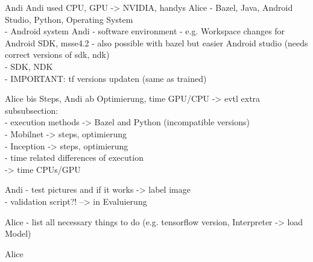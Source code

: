 	 Andi
	 Andi
		used CPU, GPU -> NVIDIA, handys
	 Alice
	- Bazel, Java, Android Studio, Python, Operating System \\
 	- Android system
	 Andi
 		- software environment
				- e.g. Workspace changes for Android SDK, msse4.2
				- also possible with bazel but easier Android studio (needs correct versions of sdk, ndk) \\
				- SDK, NDK \\
				- IMPORTANT: tf versions updaten (same as trained)

	 Alice bis Steps, Andi ab Optimierung, time GPU/CPU
	-> evtl extra subsubsection: \\
		- execution methods -> Bazel and Python (incompatible versions) \\
		- Mobilnet -> steps, optimierung \\
		- Inception -> steps, optimierung \\
		- time related differences of execution  \\
		  -> time CPUs/GPU

	 Andi
	 	- test pictures and if it works -> label image \\
	 	- validation script?! --> in Evaluierung

	 Alice
		- list all necessary things to do (e.g. tensorflow version, Interpreter -> load Model)

	 Alice
